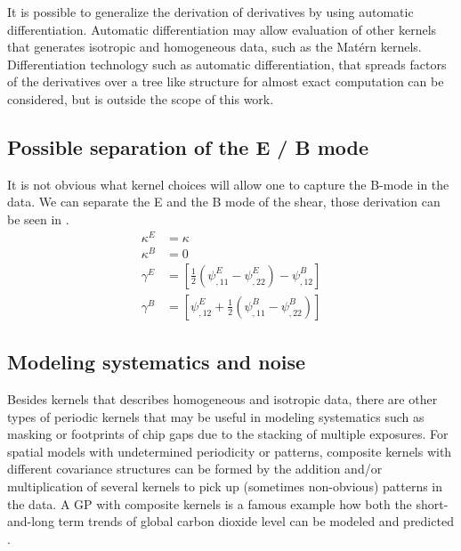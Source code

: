 It is possible to generalize the derivation of derivatives by using automatic
differentiation. Automatic differentiation may allow evaluation of other
kernels that generates isotropic and homogeneous data, 
such as the Mat\'{e}rn kernels.  
Differentiation technology such as automatic differentiation, 
that spreads factors of the derivatives over a tree like structure for
almost exact computation can be considered, but is outside the scope of this work.



\subsection{Possible separation of the E / B mode}


It is not obvious what kernel choices will allow one to capture the B-mode 
in the data.
We can separate the E and the B mode of the shear, those derivation can be seen in  
\cite{Schneider2001a}.
 \begin{align}
	\kappa^E & = \kappa\\
	\kappa^B & = 0 \\
	\gamma^E &= \left[\frac{1}{2} (\psi^E_{,11} - \psi^E_{,22}) -
	\psi^B_{,12}\right]\\
	\gamma^B &= \left[\psi^E_{,12} + \frac{1}{2} (\psi^B_{,11} - \psi^B_{,22})\right]
\end{align}


\subsection{Modeling systematics and noise}
Besides kernels that describes homogeneous and isotropic data,
there are other types of periodic kernels that may be useful
in modeling systematics such as masking or footprints of chip gaps due to the
stacking of multiple exposures.
For spatial models with undetermined periodicity or patterns, 
composite kernels with different covariance structures 
can be formed by the addition and/or multiplication of several kernels
 to pick up (sometimes non-obvious) patterns in the data. 
A GP with composite kernels is a
famous example how both the short-and-long term trends of global carbon
dioxide level can be modeled and predicted \citep{Duvenaud2013}.



